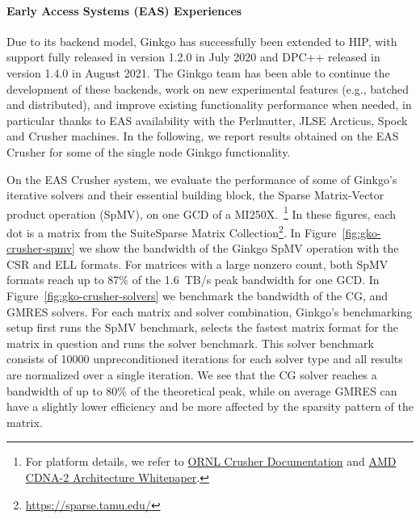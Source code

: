 \paragraph{Early Access Systems (EAS) Experiences}
Due to its backend model, Ginkgo has successfully been extended to HIP, with
support fully released in version 1.2.0 in July 2020 and DPC++ released in
version 1.4.0 in August 2021. The Ginkgo team has been able to continue the
development of these backends, work on new experimental features (e.g., batched
and distributed), and improve existing functionality performance when needed, in
particular thanks to EAS availability with the Perlmutter, JLSE Arcticus, Spock
and Crusher machines. In the following, we report results obtained on the EAS
Crusher for some of the single node Ginkgo functionality.

On the EAS Crusher system, we evaluate the performance of some of Ginkgo's
iterative solvers and their essential building block, the Sparse Matrix-Vector
product operation (SpMV), on one GCD of a MI250X.~\footnote{For platform
  details, we refer to
  \href{https://docs.olcf.ornl.gov/systems/crusher_quick_start_guide.html}{ORNL
    Crusher Documentation} and
  \href{https://www.amd.com/system/files/documents/amd-cdna2-white-paper.pdf}{AMD
    CDNA-2 Architecture Whitepaper}.} In these figures, each dot is a matrix
from the SuiteSparse Matrix Collection\footnote{\url{https://sparse.tamu.edu/}}.
In Figure~\ref{fig:gko-crusher-spmv} we show the bandwidth of the Ginkgo SpMV
operation with the CSR and ELL formats. For matrices with a large nonzero count,
both SpMV formats reach up to 87\% of the 1.6~TB/s peak bandwidth for one GCD.
In Figure~\ref{fig:gko-crusher-solvers} we benchmark the bandwidth of the CG,
and GMRES solvers. For each matrix and solver combination, Ginkgo's benchmarking 
setup first runs the SpMV benchmark, selects the fastest matrix format for the matrix
in question and runs the solver benchmark. This solver benchmark consists of 10000
unpreconditioned iterations for each solver type and all results are normalized over a
single iteration. We see that the CG solver reaches a bandwidth of up to 80\% of the
theoretical peak, while on average GMRES can have a slightly lower efficiency and be
more affected by the sparsity pattern of the matrix.


